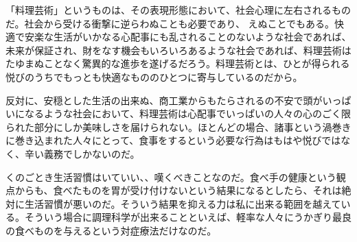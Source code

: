 \begin{Main}
「料理芸術」というものは、その表現形態において、社会心理に左右されるものだ。社会から受ける衝撃に逆らわぬことも必要であり、
えぬことでもある。快適で安楽な生活がいかなる心配事にも乱されることのないような社会であれば、未来が保証され、財をなす機会もいろいろあるような社会であれば、料理芸術はたゆまぬことなく驚異的な進歩を遂げるだろう。料理芸術とは、ひとが得られる悦びのうちでもっとも快適なもののひとつに寄与しているのだから。

反対に、安穏とした生活の出来ぬ、商工業からもたらされるの不安で頭がいっぱいになるような社会において、料理芸術は心配事でいっぱいの人々の心のごく限られた部分にしか美味しさを届けられない。ほとんどの場合、諸事という渦巻きに巻き込まれた人々にとって、食事をするという必要な行為はもはや悦びではなく、辛い義務でしかないのだ。

くのごとき生活習慣はいていい、、嘆くべきことなのだ。食べ手の健康という観点からも、食べたものを胃が受け付けないという結果になるとしたら、それは絶対に生活習慣が悪いのだ。そういう結果を抑える力は私に出来る範囲を越えている。そういう場合に調理科学が出来ることといえば、軽率な人々にうかぎり最良の食べものを与えるという対症療法だけなのだ。


\end{Main}
